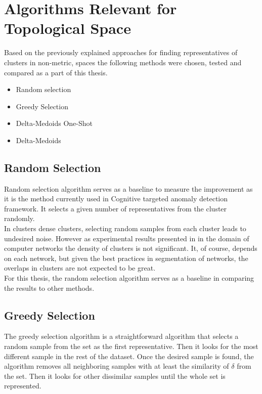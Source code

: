 \documentclass[thesis=B,english]{FITthesis}[2012/10/20]
\begin{document}
\section{Algorithms Relevant for Topological Space}\label{sec:relevant_methods}
Based on the previously explained approaches for finding representatives of clusters in non-metric, spaces the following methods were chosen, tested and compared as a part of this thesis.
\begin{itemize}
    \item Random selection
    \item Greedy Selection
    \item Delta-Medoids One-Shot
    \item Delta-Medoids 
\end{itemize}

\subsection{Random Selection}\label{subsec:random_select}

Random selection algorithm serves as a baseline to measure the improvement as it is the method currently used in Cognitive targeted anomaly detection framework.
It selects a given number of representatives from the cluster randomly. \\

In clusters dense clusters, selecting random samples from each cluster leads to undesired noise.
However as experimental results presented in \cite{kopp2018community} in the domain of computer networks the density of clusters is not significant.
It, of course, depends on each network, but given the best practices in segmentation of networks, the overlaps in clusters are not expected to be great. \\

For this thesis, the random selection algorithm serves as a baseline in comparing the results to other methods.

\subsection{Greedy Selection}\label{subsec:greedy_select}
The greedy selection algorithm is a straightforward algorithm that selects a random sample from the set as the first representative.
Then it looks for the most different sample in the rest of the dataset.
Once the desired sample is found, the algorithm removes all neighboring samples with at least the similarity of $\delta$ from the set.
Then it looks for other dissimilar samples until the whole set is represented. \\ 
\end{document}
